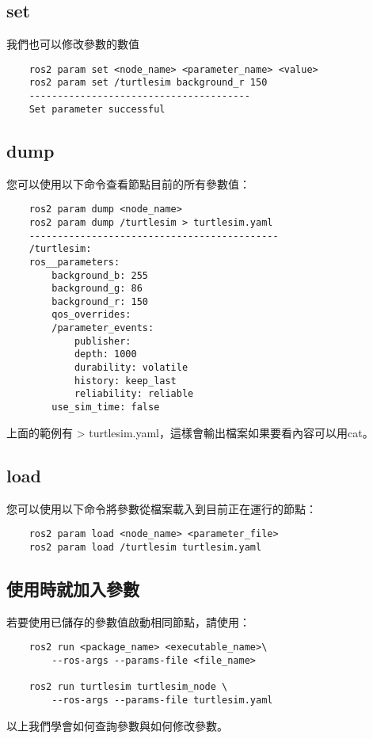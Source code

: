 \subsection{set}
我們也可以修改參數的數值
\begin{verbatim}
    ros2 param set <node_name> <parameter_name> <value>
    ros2 param set /turtlesim background_r 150
    ---------------------------------------
    Set parameter successful
\end{verbatim}
\subsection{dump}
您可以使用以下命令查看節點目前的所有參數值：

\begin{verbatim}
    ros2 param dump <node_name>
    ros2 param dump /turtlesim > turtlesim.yaml
    --------------------------------------------
    /turtlesim:
    ros__parameters:
        background_b: 255
        background_g: 86
        background_r: 150
        qos_overrides:
        /parameter_events:
            publisher:
            depth: 1000
            durability: volatile
            history: keep_last
            reliability: reliable
        use_sim_time: false
\end{verbatim}
上面的範例有 > turtlesim.yaml，這樣會輸出檔案如果要看內容可以用cat。

\subsection{load}
您可以使用以下命令將參數從檔案載入到目前正在運行的節點：

\begin{verbatim}
    ros2 param load <node_name> <parameter_file>
    ros2 param load /turtlesim turtlesim.yaml
\end{verbatim}

\subsection{使用時就加入參數}
若要使用已儲存的參數值啟動相同節點，請使用：
\begin{verbatim}
    ros2 run <package_name> <executable_name>\ 
        --ros-args --params-file <file_name>

    ros2 run turtlesim turtlesim_node \ 
        --ros-args --params-file turtlesim.yaml
\end{verbatim}

以上我們學會如何查詢參數與如何修改參數。

